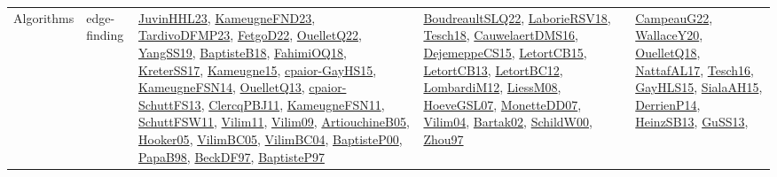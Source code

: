 {\begin{longtable}{lp{3cm}>{\raggedright}p{6cm}>{\raggedright}p{6cm}p{8cm}}
Algorithms & edge-finding & \href{papers/JuvinHHL23.pdf}{JuvinHHL23}\cite{JuvinHHL23}, \href{papers/KameugneFND23.pdf}{KameugneFND23}\cite{KameugneFND23}, \href{papers/TardivoDFMP23.pdf}{TardivoDFMP23}\cite{TardivoDFMP23}, \href{articles/FetgoD22.pdf}{FetgoD22}\cite{FetgoD22}, \href{papers/OuelletQ22.pdf}{OuelletQ22}\cite{OuelletQ22}, \href{papers/YangSS19.pdf}{YangSS19}\cite{YangSS19}, \href{articles/BaptisteB18.pdf}{BaptisteB18}\cite{BaptisteB18}, \href{articles/FahimiOQ18.pdf}{FahimiOQ18}\cite{FahimiOQ18}, \href{articles/KreterSS17.pdf}{KreterSS17}\cite{KreterSS17}, \href{articles/Kameugne15.pdf}{Kameugne15}\cite{Kameugne15}, \href{papers/cpaior-GayHS15.pdf}{cpaior-GayHS15}\cite{cpaior-GayHS15}, \href{articles/KameugneFSN14.pdf}{KameugneFSN14}\cite{KameugneFSN14}, \href{papers/OuelletQ13.pdf}{OuelletQ13}\cite{OuelletQ13}, \href{papers/cpaior-SchuttFS13.pdf}{cpaior-SchuttFS13}\cite{cpaior-SchuttFS13}, \href{papers/ClercqPBJ11.pdf}{ClercqPBJ11}\cite{ClercqPBJ11}, \href{papers/KameugneFSN11.pdf}{KameugneFSN11}\cite{KameugneFSN11}, \href{articles/SchuttFSW11.pdf}{SchuttFSW11}\cite{SchuttFSW11}, \href{papers/Vilim11.pdf}{Vilim11}\cite{Vilim11}, \href{papers/Vilim09.pdf}{Vilim09}\cite{Vilim09}, \href{papers/ArtiouchineB05.pdf}{ArtiouchineB05}\cite{ArtiouchineB05}, \href{articles/Hooker05.pdf}{Hooker05}\cite{Hooker05}, \href{articles/VilimBC05.pdf}{VilimBC05}\cite{VilimBC05}, \href{papers/VilimBC04.pdf}{VilimBC04}\cite{VilimBC04}, \href{articles/BaptisteP00.pdf}{BaptisteP00}\cite{BaptisteP00}, \href{articles/PapaB98.pdf}{PapaB98}\cite{PapaB98}, \href{papers/BeckDF97.pdf}{BeckDF97}\cite{BeckDF97}, \href{papers/BaptisteP97.pdf}{BaptisteP97}\cite{BaptisteP97} & \href{papers/BoudreaultSLQ22.pdf}{BoudreaultSLQ22}\cite{BoudreaultSLQ22}, \href{articles/LaborieRSV18.pdf}{LaborieRSV18}\cite{LaborieRSV18}, \href{papers/Tesch18.pdf}{Tesch18}\cite{Tesch18}, \href{papers/CauwelaertDMS16.pdf}{CauwelaertDMS16}\cite{CauwelaertDMS16}, \href{papers/DejemeppeCS15.pdf}{DejemeppeCS15}\cite{DejemeppeCS15}, \href{articles/LetortCB15.pdf}{LetortCB15}\cite{LetortCB15}, \href{papers/LetortCB13.pdf}{LetortCB13}\cite{LetortCB13}, \href{papers/LetortBC12.pdf}{LetortBC12}\cite{LetortBC12}, \href{articles/LombardiM12.pdf}{LombardiM12}\cite{LombardiM12}, \href{articles/LiessM08.pdf}{LiessM08}\cite{LiessM08}, \href{papers/HoeveGSL07.pdf}{HoeveGSL07}\cite{HoeveGSL07}, \href{papers/MonetteDD07.pdf}{MonetteDD07}\cite{MonetteDD07}, \href{papers/Vilim04.pdf}{Vilim04}\cite{Vilim04}, \href{papers/Bartak02.pdf}{Bartak02}\cite{Bartak02}, \href{articles/SchildW00.pdf}{SchildW00}\cite{SchildW00}, \href{articles/Zhou97.pdf}{Zhou97}\cite{Zhou97} & \href{articles/CampeauG22.pdf}{CampeauG22}\cite{CampeauG22}, \href{articles/WallaceY20.pdf}{WallaceY20}\cite{WallaceY20}, \href{papers/OuelletQ18.pdf}{OuelletQ18}\cite{OuelletQ18}, \href{articles/NattafAL17.pdf}{NattafAL17}\cite{NattafAL17}, \href{papers/Tesch16.pdf}{Tesch16}\cite{Tesch16}, \href{papers/GayHLS15.pdf}{GayHLS15}\cite{GayHLS15}, \href{papers/SialaAH15.pdf}{SialaAH15}\cite{SialaAH15}, \href{papers/DerrienP14.pdf}{DerrienP14}\cite{DerrienP14}, \href{articles/HeinzSB13.pdf}{HeinzSB13}\cite{HeinzSB13}, \href{papers/GuSS13.pdf}{GuSS13}\cite{GuSS13}, 
\end{longtable}}
